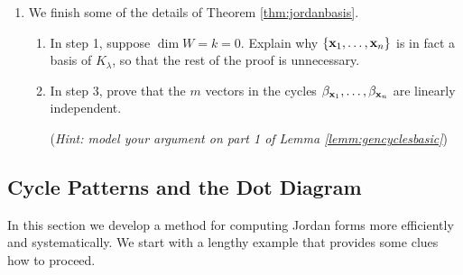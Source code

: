 \begin{exercises}
\begin{enumerate}
	  
	  \item\label{exs:jordanproof} We finish some of the details of Theorem \ref{thm:jordanbasis}.
	  \begin{enumerate}
	    \item In step 1, suppose $\dim W=k=0$. Explain why $\{{\mathbf{x}}_1,\ldots,{\mathbf{x}}_n\}$ is in fact a basis of $K_\lambda$, so that the rest of the proof is unnecessary.
	    \item In step 3, prove that the $m$ vectors in the cycles $\beta_{{\mathbf{x}}_1},\ldots,\beta_{{\mathbf{x}}_n}$ are linearly independent.\par
	    (\emph{Hint: model your argument on part 1 of Lemma \ref{lemm:gencyclesbasic}})
	  \end{enumerate}
	 
	\end{enumerate}
\end{exercises}



\clearpage



\subsection{Cycle Patterns and the Dot Diagram}


In this section we develop a method for computing Jordan forms more efficiently and systematically. We start with a lengthy example that provides some clues how to proceed.

